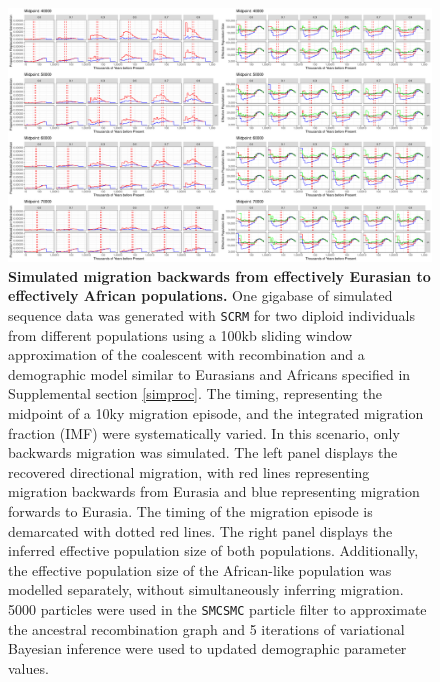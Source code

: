 \documentclass{article}
\begin{document}
\clearpage
\begin{figure}
	\centering
	\includegraphics[width=\textwidth]{plot/backward_different_starts.pdf}
	\caption{{\bf Simulated migration backwards from effectively Eurasian to effectively African populations.} One gigabase of simulated sequence data was generated with {\tt SCRM} for two diploid individuals from different populations using a 100kb sliding window approximation of the coalescent with recombination and a demographic model similar to Eurasians and Africans specified in Supplemental section \ref{simproc}. The timing, representing the midpoint of a 10ky migration episode, and the integrated migration fraction (IMF) were systematically varied. In this scenario, only backwards migration was simulated. The left panel displays the recovered directional migration, with red lines representing migration backwards from Eurasia and blue representing migration forwards to Eurasia. The timing of the migration episode is demarcated with dotted red lines. The right panel displays the inferred effective population size of both populations. Additionally, the effective population size of the African-like population was modelled separately, without simultaneously inferring migration. 5000 particles were used in the {\tt SMCSMC} particle filter to approximate the ancestral recombination graph and 5 iterations of variational Bayesian inference were used to updated demographic parameter values.}
	\label{fig:backsim}
\end{figure}
\end{document}
